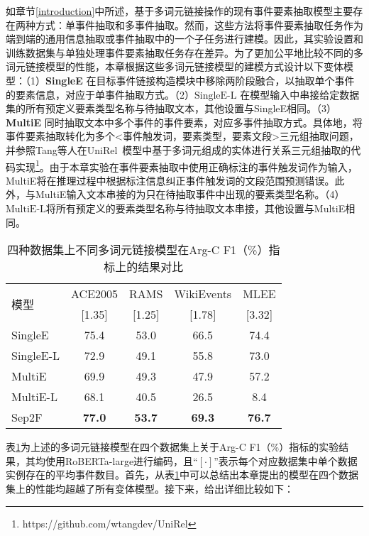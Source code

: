 如章节\ref{introduction}中所述，基于多词元链接操作的现有事件要素抽取模型主要存在两种方式：单事件抽取和多事件抽取。然而，这些方法将事件要素抽取任务作为端到端的通用信息抽取或事件抽取中的一个子任务进行建模。因此，其实验设置和训练数据集与单独处理事件要素抽取任务存在差异。为了更加公平地比较不同的多词元链接模型的性能，本章根据这些多词元链接模型的建模方式设计以下变体模型：（1）\textbf{SingleE} 在目标事件链接构造模块中移除两阶段融合，以抽取单个事件的要素信息，对应于单事件抽取方式。（2）\textbf{$\textrm{SingleE-L}$} 在模型输入中串接给定数据集的所有预定义要素类型名称与待抽取文本，其他设置与SingleE相同。（3）\textbf{MultiE} 同时抽取文本中多个事件的事件要素，对应多事件抽取方式。具体地，将事件要素抽取转化为多个<事件触发词，要素类型，要素文段>三元组抽取问题，并参照Tang等人在UniRel~\cite{tang2022unirel}模型中基于多词元组成的实体进行关系三元组抽取的代码实现\footnote{https://github.com/wtangdev/UniRel}。由于本章实验在事件要素抽取中使用正确标注的事件触发词作为输入，MultiE将在推理过程中根据标注信息纠正事件触发词的文段范围预测错误。此外，与MultiE输入文本串接的为只在待抽取事件中出现的要素类型名称。（4）\textbf{$\textrm{MultiE-L}$}将所有预定义的要素类型名称与待抽取文本串接，其他设置与MultiE相同。

\begin{table}[htp]
\centering
\caption{四种数据集上不同多词元链接模型在Arg-C F1（\%）指标上的结果对比}
\begin{tabular}{lcccc}
\toprule
\multicolumn{1}{l}{\multirow{2}{*}{模型}} & ACE2005 & RAMS & WikiEvents & MLEE \\ 
\multicolumn{1}{l}{} & [1.35] & [1.25] & [1.78] & [3.32] \\ \midrule
SingleE  & 75.4 & 53.0 & 66.5 & 74.4 \\
SingleE-L  & 72.9 & 49.1 & 55.8 & 73.0 \\
MultiE  & 69.9 & 49.3 & 47.9 & 57.2\\ 
MultiE-L & 68.1 & 40.5 & 26.5 & 8.4\\
Sep2F & \textbf{77.0} & \textbf{53.7} & \textbf{69.3} & \textbf{76.7} \\ 
\bottomrule
\end{tabular}
\label{strategy}
\end{table}

表\ref{strategy}为上述的多词元链接模型在四个数据集上关于Arg-C F1（\%）指标的实验结果，其均使用RoBERTa-large进行编码，且“$[\cdot]$”表示每个对应数据集中单个数据实例存在的平均事件数目。首先，从表\ref{strategy}中可以总结出本章提出的模型在四个数据集上的性能均超越了所有变体模型。接下来，给出详细比较如下：


